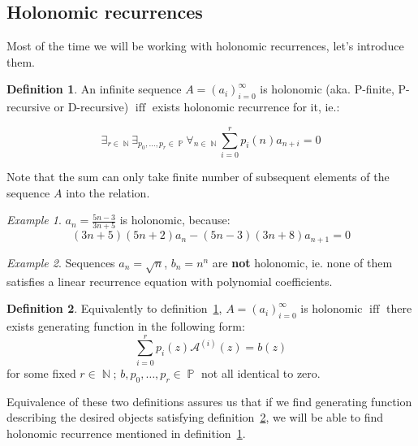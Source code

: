 \documentclass[final]{article}
\theoremstyle{definition}
\newtheorem{definition}{Definition}[subsection]
\theoremstyle{remark}
\newtheorem{example}{Example}[subsection]
\newcommand{\gf}[1]{\ensuremath{\mathcal{#1}}}
\DeclareMathOperator{\textiff}{\text{iff}}
\DeclareMathOperator{\N}{\mathbb{N}}
\DeclareMathOperator{\poly}{\mathbb{P}}
\begin{document}
\subsection{Holonomic recurrences}%
\label{sub:holonomic_recurrences}

Most of the time we will be working with holonomic recurrences, let's introduce them.

\begin{definition}
    \label{def:holo_1}
    \cite{holotoolkit}
    An infinite sequence \(A = (a_i)_{i=0}^{\infty}\) is holonomic (aka. P-finite, P-recursive or D-recursive) \(\textiff\) exists holonomic recurrence for it, ie.:

\[\exists_{r \in \N} \exists_{p_0, \ldots, p_r \in \poly} \forall_{n \in \N} \sum_{i=0}^r p_i(n)a_{n+i} = 0\]
\end{definition}

Note that the sum can only take finite number of subsequent elements of the sequence \(A\) into the relation.

\begin{example}
    \(a_n = \frac{5n - 3}{3n + 5}\) is holonomic, because:
    \[(3n + 5)(5n + 2) a_n - (5n - 3)(3n + 8) a_{n+1} = 0\]
\end{example}

\begin{example}
    Sequences \(a_n = \sqrt{n}\), \(b_n = n^n\) are \textbf{not} holonomic, ie. none of them satisfies a linear recurrence equation with polynomial coefficients\cite{nonholo}.
\end{example}

\begin{definition}
    \label{def:holo_2}
    \cite{complexity}
    Equivalently to definition\ \ref{def:holo_1}, \(A = (a_i)_{i=0}^{\infty}\) is holonomic \(\textiff\) there exists generating function in the following form:
    \[\sum_{i=0}^{r} p_i(z) \gf{A}^{(i)}(z) = b(z)\]
    for some fixed \(r \in \N\); \(b, p_0, \ldots, p_r \in \poly\) not all identical to zero.
\end{definition}

Equivalence of these two definitions assures us that if we find generating function describing the desired objects satisfying definition\ \ref{def:holo_2}, we will be able to find holonomic recurrence mentioned in definition\ \ref{def:holo_1}.\cite{complexity}
\end{document}
